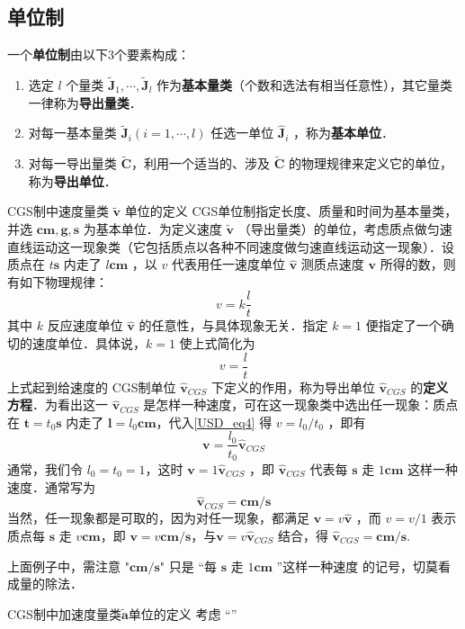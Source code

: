 \subsection{单位制}
一个\textbf{单位制}由以下3个要素构成：
\begin{enumerate}
\item 选定 $l$ 个量类 $\tilde{\boldsymbol{J}}_1,\cdots,\tilde{\boldsymbol{J}}_l$ 作为\textbf{基本量类}（个数和选法有相当任意性），其它量类一律称为\textbf{导出量类}．  
\item 对每一基本量类 $\tilde{\boldsymbol{J}}_i(i=1,\cdots,l)$ 任选一单位 $\hat{\boldsymbol{J}}_i$ ，称为\textbf{基本单位}．
\item 对每一导出量类 $\tilde{\boldsymbol{C}}$，利用一个适当的、涉及 $\tilde{\boldsymbol{C}}$ 的物理规律来定义它的单位，称为\textbf{导出单位}．
\end{enumerate}
\begin{example}{CGS制中速度量类 $\tilde{\boldsymbol{v}
}$ 单位的定义}
CGS单位制指定长度、质量和时间为基本量类，并选 $\boldsymbol{cm},\boldsymbol{g},\boldsymbol{s}$ 为基本单位．为定义速度 $\tilde{\boldsymbol{v}}$ （导出量类）的单位，考虑质点做匀速直线运动这一现象类（它包括质点以各种不同速度做匀速直线运动这一现象）．设质点在 $t\boldsymbol{s}$ 内走了 $l\boldsymbol{cm}$ ，以 $v$ 代表用任一速度单位 $\hat{\boldsymbol{v}}$ 测质点速度 $\boldsymbol{v}$ 所得的数，则有如下物理规律：
\begin{equation}
v=k\frac{l}{t}
\end{equation}
其中 $k$ 反应速度单位 $\hat{\boldsymbol{v}}$ 的任意性，与具体现象无关．指定 $k=1$ 便指定了一个确切的速度单位．具体说，$k=1$ 使上式简化为
\begin{equation}\label{USD_eq4}
v=\frac{l}{t}
\end{equation}
上式起到给速度的 CGS制单位 $\hat{\boldsymbol{v}}_{CGS}$ 下定义的作用，称为导出单位 $\hat{\boldsymbol{v}}_{CGS}$ 的\textbf{定义方程}．为看出这一 $\hat{\boldsymbol{v}}_{CGS}$ 是怎样一种速度，可在这一现象类中选出任一现象：质点在 $\boldsymbol{t}=t_0\boldsymbol{s}$ 内走了 $\boldsymbol{l}=l_0\boldsymbol{cm}$，代入\autoref{USD_eq4} 得 $v=l_0/t_0$ ，即有
\begin{equation}
\boldsymbol{v}=\frac{l_0}{t_0}\hat{\boldsymbol{v}}_{CGS}
\end{equation}
通常，我们令 $l_0=t_0=1$，这时 $\boldsymbol{v}=1\hat{\boldsymbol{v}}_{CGS}$ ，即 $\hat{\boldsymbol{v}}_{CGS}$ 代表每 $\boldsymbol{s}$ 走 $1\boldsymbol{cm}$ 这样一种速度．通常写为
\begin{equation}
\hat{\boldsymbol{v}}_{CGS}=\boldsymbol{cm}/\boldsymbol{s}
\end{equation}
当然，任一现象都是可取的，因为对任一现象，都满足 $\boldsymbol{v}=v\hat{\boldsymbol{v}}$ ，而 $v=v/1$ 表示质点每 $\boldsymbol{s}$ 走 $v\boldsymbol{cm}$，即 $\boldsymbol{v}=v\boldsymbol{cm}/\boldsymbol{s}$，与$\boldsymbol{v}=v\hat{\boldsymbol{v}}_{CGS}$ 结合，得 $\hat{\boldsymbol{v}}_{CGS}=\boldsymbol{cm}/\boldsymbol{s}$.

\end{example}
上面例子中，需注意 "$\boldsymbol{cm/s}$" 只是 “每 $\boldsymbol{s}$ 走 $1\boldsymbol{cm}$ ”这样一种速度 的记号，切莫看成量的除法．
\begin{example}{CGS制中加速度量类$\tilde{\boldsymbol{a}}$单位的定义}
考虑 “”
\end{example}